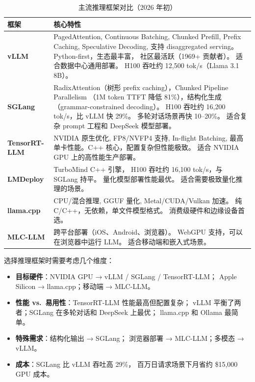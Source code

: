 \begin{table}[H]
\centering\small
\renewcommand{\arraystretch}{1.3}
\caption{主流推理框架对比（2026 年初）}\label{tab:inference-frameworks}
\begin{tabularx}{\linewidth}{l X}
\toprule
\rowcolor{figLightGray}
\textbf{框架} & \textbf{核心特性} \\
\midrule
\textbf{vLLM} & PagedAttention, Continuous Batching, Chunked Prefill, Prefix Caching,
  Speculative Decoding, 支持 disaggregated serving。Python-first，生态最丰富，
  社区最活跃（1969+ 贡献者）。
  适合数据中心通用部署。
  H100 吞吐约 12,500 tok/s（Llama 3.1 8B）。 \\
\textbf{SGLang} & RadixAttention（树形 prefix caching），Chunked Pipeline Parallelism
  （1M token TTFT 降低 81\%），结构化生成（grammar-constrained decoding）。
  H100 吞吐约 16,200 tok/s，比 vLLM 快 29\%。
  多轮对话场景再快 10--20\%。
  适合复杂 prompt 工程和 DeepSeek 模型部署。 \\
\textbf{TensorRT-LLM} & NVIDIA 原生优化, FP8/NVFP4 支持, In-flight Batching,
  最高单卡性能。C++ 核心，配置复杂但性能极致。
  适合 NVIDIA GPU 上的高性能生产部署。 \\
\textbf{LMDeploy} & TurboMind C++ 引擎，
  H100 吞吐约 16,100 tok/s，与 SGLang 持平。
  量化模型部署性能最优。
  适合需要极致量化推理的场景。 \\
\textbf{llama.cpp} & CPU/混合推理, GGUF 量化, Metal/CUDA/Vulkan 加速。
  纯 C/C++，无依赖，单文件模型格式。
  消费级硬件和边缘设备首选。 \\
\textbf{MLC-LLM} & 跨平台部署（iOS、Android、浏览器）。
  WebGPU 支持，可以在浏览器中运行 LLM。
  适合移动端和嵌入式场景。 \\
\bottomrule
\end{tabularx}
\end{table}

选择推理框架时需要考虑几个维度：
\begin{itemize}[noitemsep]
  \item \textbf{目标硬件}：NVIDIA GPU → vLLM / SGLang / TensorRT-LLM；
        Apple Silicon → llama.cpp；移动端 → MLC-LLM。
  \item \textbf{性能 vs.\ 易用性}：TensorRT-LLM 性能最高但配置复杂；
        vLLM 平衡了两者；SGLang 在多轮对话和 DeepSeek 上最优；
        llama.cpp 和 Ollama 最简单。
  \item \textbf{特殊需求}：结构化输出 → SGLang；
        浏览器部署 → MLC-LLM；多模态 → vLLM。
  \item \textbf{成本}：SGLang 比 vLLM 吞吐高 29\%，
        百万日请求场景下月省约 \$15,000 GPU 成本。
\end{itemize}

